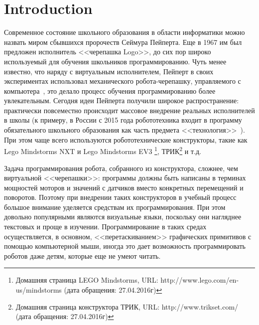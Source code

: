 \documentclass[conference]{IEEEtran}
\begin{document}
\section{Introduction}
Современное состояние школьного образования в области информатики можно назвать миром сбывшихся пророчеств Сеймура Пейперта. Еще в 1967 им был предложен исполнитель <<черепашка Logo>>, до сих пор широко используемый для обучения школьников программированию. Чуть менее известно, что наряду с виртуальным исполнителем, Пейперт в своих экспериментах использовал механического робота-черепашку, управляемого с компьютера~\cite{papert1980mindstorms}, это делало процесс обучения программированию более увлекательным. Сегодня идеи Пейперта получили широкое распространение: практически повсеместно происходит массовое внедрение реальных исполнителей в школы (к примеру, в России с 2015 года робототехника входит в программу обязательного школьного образования как часть предмета <<технология>>~\cite{черёмухин2014внедрение,лучин2016внедрение}). При этом чаще всего используются робототехнические конструкторы, такие как Lego Mindstorms NXT и Lego Mindstorms EV3%
\footnote{Домашняя страница LEGO Mindstorms, URL: http://www.lego.com/en-us/mindstorms (дата обращения: 27.04.2016г)}, 
ТРИК\footnote{Домашняя страница конструктора ТРИК, URL: http://www.trikset.com/ (дата обращения: 27.04.2016г)} и т.д. 

Задача программирования робота, собранного из конструктора, сложнее, чем виртуальной <<черепашки>>: программы должны быть написаны в терминах мощностей моторов и значений с датчиков вместо конкретных перемещений и поворотов. Поэтому при внедрении таких конструкторов в учебный процесс большое внимание уделяется средствам их программирования. При этом довольно популярными являются визуальные языки, поскольку они нагляднее текстовых и проще в изучении. Программирование в таких средах осуществляется, в основном, <<перетаскиванием>> графических примитивов с помощью компьютерной мыши, иногда это дает возможность программировать роботов даже детям, которые еще не умеют читать. 
\end{document}
